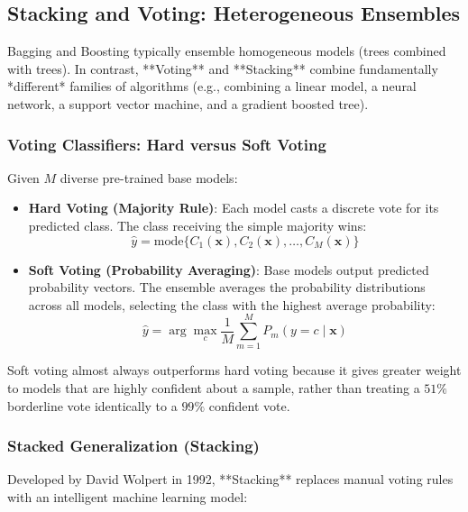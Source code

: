 \subsection{Stacking and Voting: Heterogeneous Ensembles}\label{subsec:stacking_voting}

Bagging and Boosting typically ensemble homogeneous models (trees combined with trees). In contrast, **Voting** and **Stacking** combine fundamentally *different* families of algorithms (e.g., combining a linear model, a neural network, a support vector machine, and a gradient boosted tree).

\subsubsection{Voting Classifiers: Hard versus Soft Voting}
Given $M$ diverse pre-trained base models:
\begin{itemize}
    \item \textbf{Hard Voting (Majority Rule)}: Each model casts a discrete vote for its predicted class. The class receiving the simple majority wins:
    \begin{equation}
    \hat{y} = \text{mode}\{C_1(\mathbf{x}), C_2(\mathbf{x}), \dots, C_M(\mathbf{x})\}\label{eq:hard_voting}
    \end{equation}
    \item \textbf{Soft Voting (Probability Averaging)}: Base models output predicted probability vectors. The ensemble averages the probability distributions across all models, selecting the class with the highest average probability:
    \begin{equation}
    \hat{y} = \arg\max_{c} \frac{1}{M} \sum_{m=1}^{M} P_m(y = c \mid \mathbf{x})\label{eq:soft_voting}
    \end{equation}
\end{itemize}
Soft voting almost always outperforms hard voting because it gives greater weight to models that are highly confident about a sample, rather than treating a $51\%$ borderline vote identically to a $99\%$ confident vote.

\subsubsection{Stacked Generalization (Stacking)}
Developed by David Wolpert in 1992, **Stacking** replaces manual voting rules with an intelligent machine learning model:

